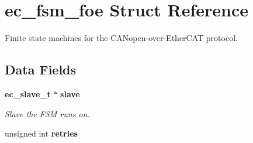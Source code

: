 \section{ec\-\_\-fsm\-\_\-foe \-Struct \-Reference}
\label{structec__fsm__foe}


\-Finite state machines for the \-C\-A\-Nopen-\/over-\/\-Ether\-C\-A\-T protocol.  


\subsection*{\-Data \-Fields}
\begin{DoxyCompactItemize}
\item 
{\bf ec\-\_\-slave\-\_\-t} $\ast$ {\bf slave}
\begin{DoxyCompactList}\small\item\em \-Slave the \-F\-S\-M runs on. \end{DoxyCompactList}\item 
unsigned int {\bf retries}\label{structec__fsm__foe_a265053a6c277b9bf66c2a28489385d13}


\end{DoxyCompactItemize}
